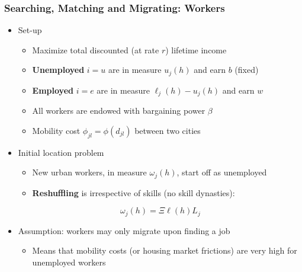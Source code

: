 \documentclass{beamer}
\newcommand{\1}{\mathbb{1}}
\begin{document}
\begin{frame}
\frametitle{Searching, Matching and Migrating: Workers}
\begin{itemize}
\item Set-up 
\begin{itemize}
\item Maximize total discounted (at rate $r$) lifetime income
\item \textbf{Unemployed} $i=u$ are in measure $u_j(h)$ and earn $b$ (fixed)
\item \textbf{Employed} $i=e$ are in measure $\ell_j(h)-u_j(h)$ and earn $w$
\item All workers are endowed with bargaining power $\beta$
\item Mobility cost $\phi_{jl}=\phi(d_{jl})$ between two cities
\end{itemize} \bigskip
\item Initial location problem
\begin{itemize}
\item New urban workers, in measure $\omega_j(h)$, start off as unemployed
\item \textbf{Reshuffling} is irrespective of skills (no skill dynasties):
\end{itemize}\smallskip
\begin{equation*}
\omega_j(h)=\Xi \ell(h)L_j
\end{equation*}

\vspace{0.3cm}
\item Assumption: workers may only migrate upon finding a job
\begin{itemize}
\item Means that mobility costs (or housing market frictions) are very high for unemployed workers 
\end{itemize}
\end{itemize}
\end{frame}
\end{document}
